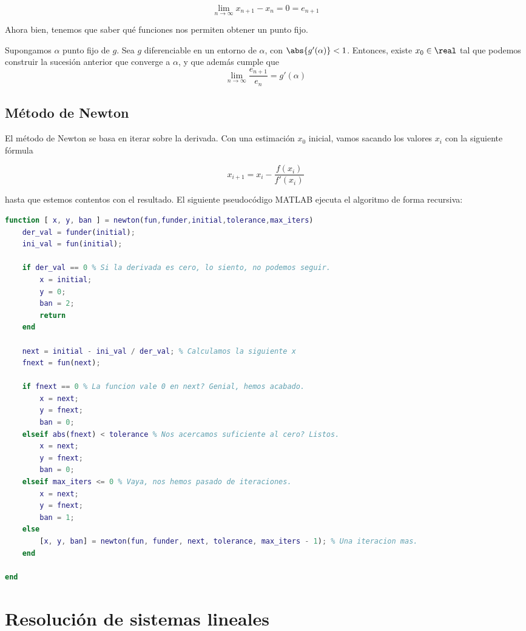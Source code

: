 \documentclass[nochap]{apuntes}
\begin{document}
\[ \lim_{n\to\infty} x_{n+1} - x_n = 0 = e_{n+1}\]

Ahora bien, tenemos que saber qué funciones nos permiten obtener un punto fijo.

\begin{theorem}
Supongamos $\alpha$ punto fijo de $g$. Sea $g$ diferenciable en un entorno de $\alpha$, con $\abs{g'(\alpha)} < 1$. Entonces, existe $x_0 \in \real$ tal que podemos construir la sucesión anterior que converge a $\alpha$, y que además cumple que \[\lim_{n\to\infty} \frac{e_{n+1}}{e_n} = g'(\alpha) \]
\end{theorem} 

\subsection{Método de Newton}

El método de Newton se basa en iterar sobre la derivada. Con una estimación $x_0$ inicial, vamos sacando los valores $x_i$ con la siguiente fórmula

\[ x_{i+1} = x_i - \frac{f(x_i)}{f'(x_i)} \]

hasta que estemos contentos con el resultado. El siguiente pseudocódigo MATLAB ejecuta el algoritmo de forma recursiva:

\begin{lstlisting}[language=matlab]
function [ x, y, ban ] = newton(fun,funder,initial,tolerance,max_iters)
    der_val = funder(initial);
    ini_val = fun(initial);
    
    if der_val == 0 % Si la derivada es cero, lo siento, no podemos seguir.
        x = initial;
        y = 0;
        ban = 2;
        return
    end
    
    next = initial - ini_val / der_val; % Calculamos la siguiente x
    fnext = fun(next);
    
    if fnext == 0 % La funcion vale 0 en next? Genial, hemos acabado.
        x = next;
        y = fnext;
        ban = 0;
    elseif abs(fnext) < tolerance % Nos acercamos suficiente al cero? Listos.
        x = next;
        y = fnext;
        ban = 0;
    elseif max_iters <= 0 % Vaya, nos hemos pasado de iteraciones.
        x = next;
        y = fnext;
        ban = 1;
    else
        [x, y, ban] = newton(fun, funder, next, tolerance, max_iters - 1); % Una iteracion mas.
    end

end
\end{lstlisting}
\section{Resolución de sistemas lineales}
\end{document}
